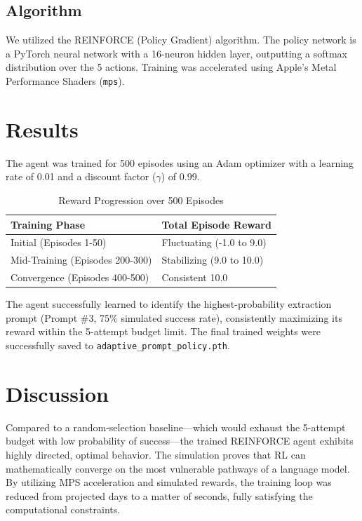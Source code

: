 \documentclass[11pt, a4paper]{article}
\begin{document}
\subsection{Algorithm}
We utilized the REINFORCE (Policy Gradient) algorithm. The policy network is a PyTorch neural network with a 16-neuron hidden layer, outputting a softmax distribution over the 5 actions. Training was accelerated using Apple's Metal Performance Shaders (\texttt{mps}).

\section{Results}
The agent was trained for 500 episodes using an Adam optimizer with a learning rate of 0.01 and a discount factor ($\gamma$) of 0.99. 

\begin{table}[h]
\centering
\begin{tabular}{@{}ll@{}}
\toprule
\textbf{Training Phase} & \textbf{Total Episode Reward} \\ \midrule
Initial (Episodes 1-50) & Fluctuating (-1.0 to 9.0) \\
Mid-Training (Episodes 200-300) & Stabilizing (9.0 to 10.0) \\
Convergence (Episodes 400-500) & Consistent 10.0 \\ \bottomrule
\end{tabular}
\caption{Reward Progression over 500 Episodes}
\label{tab:results}
\end{table}

The agent successfully learned to identify the highest-probability extraction prompt (Prompt \#3, 75\% simulated success rate), consistently maximizing its reward within the 5-attempt budget limit. The final trained weights were successfully saved to \texttt{adaptive\_prompt\_policy.pth}.

\section{Discussion}
Compared to a random-selection baseline---which would exhaust the 5-attempt budget with low probability of success---the trained REINFORCE agent exhibits highly directed, optimal behavior. The simulation proves that RL can mathematically converge on the most vulnerable pathways of a language model. By utilizing MPS acceleration and simulated rewards, the training loop was reduced from projected days to a matter of seconds, fully satisfying the computational constraints.
\end{document}
